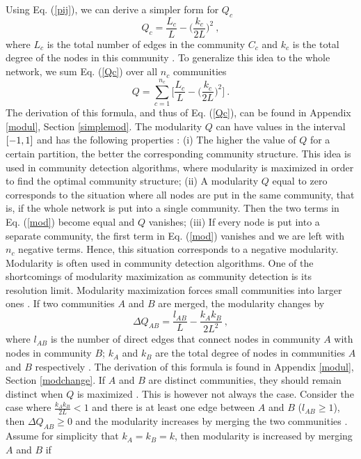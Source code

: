 \documentclass[11 pt , letterpaper , twoside , openright]{book}
\begin{document}
\newline
Using Eq. (\ref{pij}), we can derive a simpler form for $Q_c$
\begin{equation}\label{Qc}
	Q_c = \frac{L_c}{L} - \bigg(\frac{k_c}{2L}\bigg)^2 \ ,
\end{equation}
where $L_c$ is the total number of edges in the community $C_c$ and $k_c$ is the total degree of the nodes in this community \cite{Albert2016}. To generalize this idea to the whole network, we sum Eq. (\ref{Qc}) over all $n_c$ communities \cite{Albert2016}
\begin{equation}\label{mod}
	Q = \sum_{c = 1}^{n_c}\bigg[\frac{L_c}{L} - \bigg(\frac{k_c}{2L}\bigg)^2 \bigg] \ .
\end{equation}
The derivation of this formula, and thus of Eq. (\ref{Qc}), can be found in Appendix \ref{modul}, Section \ref{simplemod}. The modularity $Q$ can have values in the interval $\interval{-1}{1}$ and has the following properties \cite{Albert2016}: (i) The higher the value of $Q$ for a certain partition, the better the corresponding community structure. This idea is used in community detection algorithms, where modularity is maximized in order to find the optimal community structure; (ii) A modularity $Q$ equal to zero corresponds to the situation where all nodes are put in the same community, that is, if the whole network is put into a single community. Then the two terms in Eq. (\ref{mod}) become equal and $Q$ vanishes; (iii) If every node is put into a separate community, the first term in Eq. (\ref{mod}) vanishes and we are left with $n_c$ negative terms. Hence, this situation corresponds to a negative modularity.\\
\newline
Modularity is often used in community detection algorithms. One of the shortcomings of modularity maximization as community detection is its resolution limit. Modularity maximization forces small communities into larger ones \cite{Albert2016}. If two communities $A$ and $B$ are merged, the modularity changes by
\begin{equation}
	\Delta Q_{AB} = \frac{l_{AB}}{L} - \frac{k_Ak_B}{2L^2} \ ,
\end{equation}
where $l_{AB}$ is the number of direct edges that connect nodes in community $A$ with nodes in community $B$; $k_A$ and $k_B$ are the total degree of nodes in communities $A$ and $B$ respectively \cite{Albert2016}. The derivation of this formula is found in Appendix \ref{modul}, Section \ref{modchange}. If $A$ and $B$ are distinct communities, they should remain distinct when $Q$ is maximized \cite{Albert2016}. This is however not always the case. Consider the case where $\frac{k_Ak_B}{2L} < 1$ and there is at least one edge between $A$ and $B$ ($l_{AB} \geqslant 1$), then $\Delta Q_{AB} \geqslant 0$ and the modularity increases by merging the two communities \cite{Albert2016}. Assume for simplicity that $k_A = k_B = k$, then modularity is increased by merging $A$ and $B$ if
\end{document}
